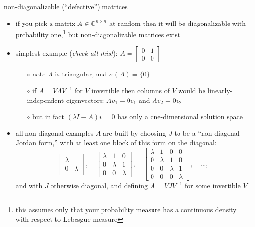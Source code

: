 \documentclass[10pt,hyperref]{beamer}
\newcommand{\CC}{\mathbb{C}}
\begin{document}
\begin{frame}{non-diagonalizable (``defective'') matrices}

\begin{itemize}
\item if you pick a matrix $A\in\CC^{n\times n}$ at random then it will be diagonalizable with probability one,\footnote{\tiny this assumes only that your probability measure has a continuous density with respect to Lebesgue measure} but non-diagonalizable matrices exist
\item simplest example (\emph{check all this!}): \quad $A = \begin{bmatrix} 0 & 1 \\ 0 & 0 \end{bmatrix}$
    \begin{itemize}
    \item[$\circ$] note $A$ is triangular, and $\sigma(A) = \{0\}$
    \item[$\circ$] if $A=V\Lambda V^{-1}$ for $V$ invertible then columns of $V$ would be linearly-independent eigenvectors: $Av_1=0v_1$ and $Av_2=0v_2$
    \item[$\circ$] but in fact $(\lambda I - A) v = 0$ has only a one-dimensional solution space
    \end{itemize}
\item all non-diagonal examples $A$ are built by choosing $J$ to be a ``non-diagonal Jordan form,'' with at least one block of this form on the diagonal:
\footnotesize
    $$\begin{bmatrix} \lambda & 1 \\ 0 & \lambda \end{bmatrix}, \quad \begin{bmatrix} \lambda & 1 & 0 \\ 0 & \lambda & 1 \\ 0 & 0 & \lambda \end{bmatrix}, \quad \begin{bmatrix} \lambda & 1 & 0 & 0 \\ 0 & \lambda & 1 & 0 \\ 0 & 0 & \lambda & 1 \\ 0 & 0 & 0 & \lambda \end{bmatrix}, \quad \dots,$$
\normalsize
and with $J$ otherwise diagonal, and defining $A=VJV^{-1}$ for some invertible $V$
\end{itemize}
\end{frame}
\end{document}
